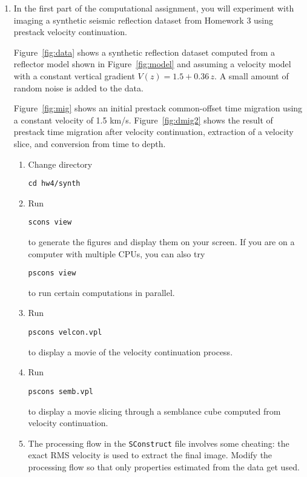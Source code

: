 \begin{enumerate}
\item In the first part of the computational assignment, you will experiment with 
  imaging a synthetic seismic reflection dataset from Homework 3 using
  prestack velocity continuation.



Figure~\ref{fig:data} shows a synthetic reflection dataset computed
from a reflector model shown in Figure~\ref{fig:model} and assuming a
velocity model with a constant vertical gradient $V(z) = 1.5 +
0.36\,z$. A small amount of random noise is added to the data.

Figure~\ref{fig:mig} shows an initial prestack common-offset time
migration using a constant velocity of 1.5 km/s. 
Figure~\ref{fig:dmig2} shows the result of prestack time
migration after velocity continuation, extraction of a velocity slice,
and conversion from time to depth.

\begin{enumerate}
\item Change directory 
\begin{verbatim}
cd hw4/synth
\end{verbatim}
\item Run
\begin{verbatim}
scons view
\end{verbatim}
to generate the figures and display them on your screen.
If you are on a computer with multiple CPUs, you
can also try
\begin{verbatim}
pscons view
\end{verbatim}
to run certain computations in parallel.
\item Run 
\begin{verbatim}
pscons velcon.vpl
\end{verbatim}
to display a movie of the velocity continuation process.
\item Run 
\begin{verbatim}
pscons semb.vpl
\end{verbatim}
to display a movie slicing through a semblance cube computed from
velocity continuation.
\item The processing flow in the \texttt{SConstruct} file involves
  some cheating: the exact RMS velocity is used to extract the final
  image. Modify the processing flow so that only properties estimated
  from the data get used. 
\end{enumerate}


\end{enumerate}
